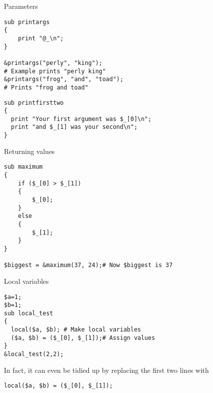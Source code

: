 \begin{frame}[containsverbatim]{Parameters}
\lstset{language=perl}
\begin{lstlisting}
sub printargs
{
	print "@_\n";
}

&printargs("perly", "king");
# Example prints "perly king"
&printargs("frog", "and", "toad"); 
# Prints "frog and toad"
\end{lstlisting}
\lstset{language=perl}
\begin{lstlisting}
sub printfirsttwo
{
  print "Your first argument was $_[0]\n";
  print "and $_[1] was your second\n";
}
\end{lstlisting}
\end{frame}


\begin{frame}[containsverbatim]{Returning values}
\lstset{language=perl}
\begin{lstlisting}
sub maximum
{
	if ($_[0] > $_[1])
	{
		$_[0];
	}
	else
	{
		$_[1];
	}
}

$biggest = &maximum(37, 24);# Now $biggest is 37
\end{lstlisting}
\end{frame}



\begin{frame}[containsverbatim]{Local variables}
\lstset{language=perl}
\begin{lstlisting}
$a=1;
$b=1;
sub local_test
{
  local($a, $b); # Make local variables
  ($a, $b) = ($_[0], $_[1]);# Assign values
}
&local_test(2,2);
\end{lstlisting}
In fact, it can even be tidied up by replacing the first two lines with 
\lstset{language=python}
\begin{lstlisting}
local($a, $b) = ($_[0], $_[1]);
\end{lstlisting}
\end{frame}



